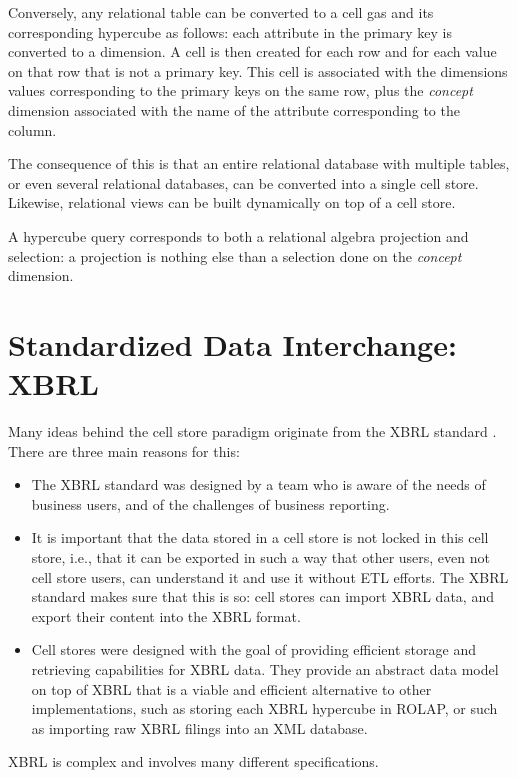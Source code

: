 \documentclass{acm_proc_article-sp}
\begin{document}
Conversely, any relational table can be converted to a cell gas and its corresponding hypercube as follows: each attribute in the primary key is converted to a dimension. A cell is
then created for each row and for each value on that row that is not a primary key. This cell is associated with the dimensions values corresponding to the primary keys on the same row, plus the \emph{concept} dimension associated with the name of the attribute corresponding to the column.

The consequence of this is that an entire relational database with multiple tables, or even several relational databases, can be converted into a single cell store. Likewise, relational views can be built dynamically on top of a cell store.

A hypercube query corresponds to both a relational algebra projection and selection: a projection is nothing else than a selection done on the \emph{concept} dimension.

\section{Standardized Data Interchange: XBRL}
\label{section-xbrl-standard}
Many ideas behind the cell store paradigm originate from the XBRL standard \cite{XBRL}. There are three main reasons for this:

\begin{itemize}
\item The XBRL standard was designed by a team who is aware of the needs of business users, and of the challenges of business reporting.
\item It is important that the data stored in a cell store is not locked in this cell store, i.e., that it can be exported in such a way that other users, even not cell store users, can understand it and use it without ETL efforts. The XBRL standard makes sure that this is so: cell stores can import XBRL data, and export their content into the XBRL format.
\item Cell stores were designed with the goal of providing efficient storage and retrieving capabilities for XBRL data. They provide an abstract data model on top of XBRL that is a viable and efficient alternative to other implementations, such as storing each XBRL hypercube in ROLAP, or such as importing raw XBRL filings into an XML database.
\end{itemize}

XBRL is complex and involves many different specifications.
\end{document}
